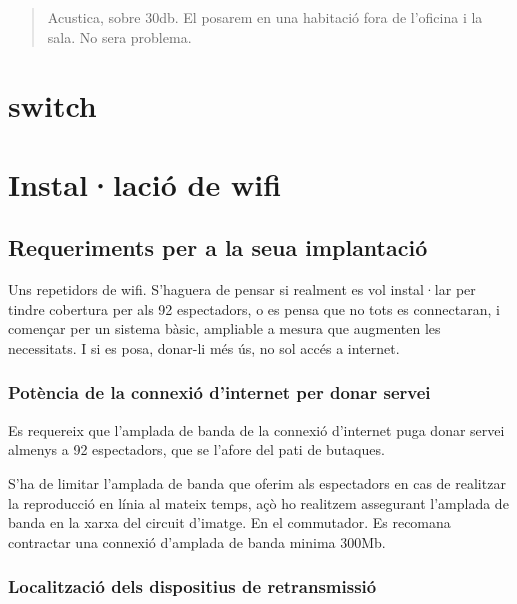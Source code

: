 \documentclass[
  10pt,
]{krantz}
\begin{document}
\begin{quote}
Acustica, sobre 30db. El posarem en una habitació fora de l'oficina i la sala. No sera problema.
\end{quote}

\hypertarget{switch}{%
\chapter{switch}\label{switch}}

\hypertarget{installaciuxf3-de-wifi}{%
\chapter{Instal·lació de wifi}\label{installaciuxf3-de-wifi}}

\hypertarget{requeriments-per-a-la-seua-implantaciuxf3}{%
\section{Requeriments per a la seua implantació}\label{requeriments-per-a-la-seua-implantaciuxf3}}

Uns repetidors de wifi. S'haguera de pensar si realment es vol instal·lar per tindre cobertura per als 92 espectadors, o es pensa que no tots es connectaran, i començar per un sistema bàsic, ampliable a mesura que augmenten les necessitats. I si es posa, donar-li més ús, no sol accés a internet.

\hypertarget{potuxe8ncia-de-la-connexiuxf3-dinternet-per-donar-servei}{%
\subsection{Potència de la connexió d'internet per donar servei}\label{potuxe8ncia-de-la-connexiuxf3-dinternet-per-donar-servei}}

Es requereix que l'amplada de banda de la connexió d'internet puga donar servei almenys a 92 espectadors, que se l'afore del pati de butaques.

S'ha de limitar l'amplada de banda que oferim als espectadors en cas de realitzar la reproducció en línia al mateix temps, açò ho realitzem assegurant l'amplada de banda en la xarxa del circuit d'imatge. En el commutador. Es recomana contractar una connexió d'amplada de banda minima 300Mb.

\hypertarget{localitzaciuxf3-dels-dispositius-de-retransmissiuxf3}{%
\subsection{Localització dels dispositius de retransmissió}\label{localitzaciuxf3-dels-dispositius-de-retransmissiuxf3}}
\end{document}
